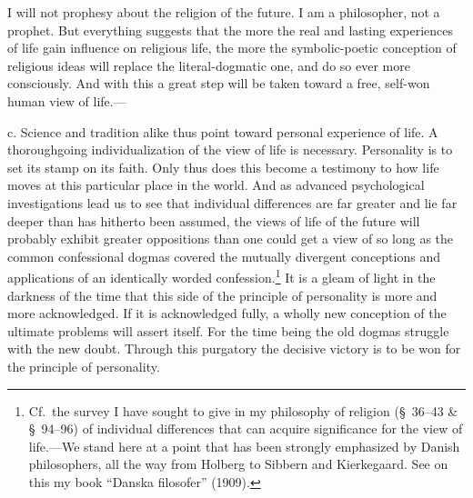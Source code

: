\documentclass[12pt]{article}
\newcommand{\opage}[1]{\marginnote{\footnotesize\textit{[#1]}}}
\begin{document}
I will not prophesy about the religion of the future. I am a philosopher, not a
prophet. But everything suggests that the more the real and lasting experiences
of life gain influence on religious life, the more the symbolic-poetic conception
of religious ideas will replace the literal-dogmatic one, and do so ever more
consciously. And with this a great step will be taken toward a free, self-won
human view of life.---

c. Science and tradition alike thus point
\opage{69}%
toward personal experience of life. A thoroughgoing individualization of the view
of life is necessary. Personality is to set its stamp on its faith. Only thus
does this become a testimony to how life moves at this particular place in the
world. And as advanced psychological investigations lead us to see that
individual differences are far greater and lie far deeper than has hitherto been
assumed, the views of life of the future will probably exhibit greater oppositions
than one could get a view of so long as the common confessional dogmas covered
the mutually divergent conceptions and applications of an identically worded
confession.\footnote{Cf.\ the survey I have sought to give in my philosophy of
religion (§~36--43 \& §~94--96) of individual differences that can acquire
significance for the view of life.---We stand here at a point that has been
strongly emphasized by Danish philosophers, all the way from Holberg to Sibbern
and Kierkegaard. See on this my book ``Danska filosofer'' (1909).} It is a gleam
of light in the darkness of the time that this side of the principle of
personality is more and more acknowledged. If it is acknowledged fully, a wholly
new conception of the ultimate problems will assert itself. For the time being
\opage{70}%
the old dogmas struggle with the new doubt. Through this purgatory the decisive
victory is to be won for the principle of personality.
\end{document}
